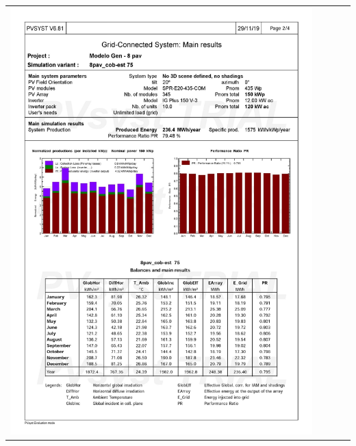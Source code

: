 \begin{table}[H]
    \centering
    \begin{tabular}{l}
        \includegraphics[width=0.9\textwidth]{figures/attachments/resultpv2.jpg}
    \end{tabular}
\end{table}
\pagebreak

